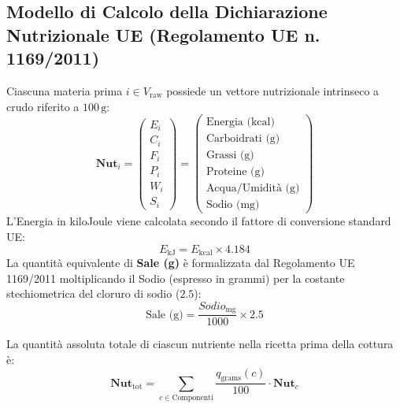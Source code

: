 \documentclass[11pt,a4paper,titlepage]{article}
\begin{document}
\subsection{Modello di Calcolo della Dichiarazione Nutrizionale UE (Regolamento UE n. 1169/2011)}
Ciascuna materia prima $i \in V_{\text{raw}}$ possiede un vettore nutrizionale intrinseco a crudo riferito a $100\,\text{g}$:
$$\mathbf{Nut}_i = \begin{pmatrix} E_i \\ C_i \\ F_i \\ P_i \\ W_i \\ S_i \end{pmatrix} = \begin{pmatrix} \text{Energia (kcal)} \\ \text{Carboidrati (g)} \\ \text{Grassi (g)} \\ \text{Proteine (g)} \\ \text{Acqua/Umidit\`a (g)} \\ \text{Sodio (mg)} \end{pmatrix}$$
L'Energia in kiloJoule viene calcolata secondo il fattore di conversione standard UE:
$$E_{\text{kJ}} = E_{\text{kcal}} \times 4.184$$
La quantit\`a equivalente di \textbf{Sale (g)} \`e formalizzata dal Regolamento UE 1169/2011 moltiplicando il Sodio (espresso in grammi) per la costante stechiometrica del cloruro di sodio ($2.5$):
$$\text{Sale (g)} = \frac{Sodio_{\text{mg}}}{1000} \times 2.5$$

La quantit\`a assoluta totale di ciascun nutriente nella ricetta prima della cottura \`e:
$$\mathbf{Nut}_{\text{tot}} = \sum_{c \in \text{Componenti}} \frac{q_{\text{grams}}(c)}{100} \cdot \mathbf{Nut}_c$$
\end{document}
